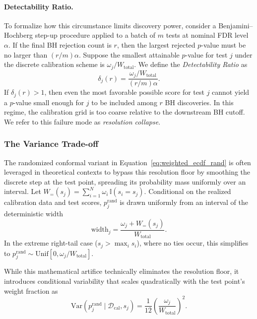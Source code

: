 \paragraph{Detectability Ratio.}
To formalize how this circumstance limits discovery power, consider
a Benjamini--Hochberg step-up procedure applied to a batch of \(m\) tests at
nominal FDR level \(\alpha\). If the final BH rejection count is \(r\), then
the largest rejected \(p\)-value must be no larger than
\((r/m)\alpha\). Suppose the smallest attainable \(p\)-value for test \(j\)
under the discrete calibration scheme is
\(\omega_j/W_{\mathrm{total}}\). We define the \textit{Detectability Ratio}
as
\begin{equation}\label{eq:detectability_ratio}
\delta_j(r)
=
\frac{\displaystyle \omega_j/W_{\mathrm{total}}}
{\displaystyle (r/m)\alpha}.
\end{equation}
If \(\delta_j(r)>1\), then even the most favorable possible score for test
\(j\) cannot yield a \(p\)-value small enough for \(j\) to be included among
\(r\) BH discoveries. In this regime, the calibration grid is too coarse
relative to the downstream BH cutoff. We refer to this failure mode as
\textit{resolution collapse}.

\subsubsection{The Variance Trade-off}
The randomized conformal variant in Equation~\eqref{eq:weighted_ecdf_rand} is often leveraged in theoretical contexts to bypass this resolution floor by smoothing the discrete step at the test point, spreading its probability mass uniformly over an interval. Let $W_{=}(s_j)=\sum_{i=1}^N \omega_i\,\mathbb{I}(s_i=s_j)$. Conditional on the realized calibration data and test scores, $p_j^{\mathrm{rand}}$ is drawn uniformly from an interval of the deterministic width 
\begin{equation}
\mathrm{width}_j = \frac{\omega_j + W_{=}(s_j)}{W_{\mathrm{total}}}.
\end{equation}
In the extreme right-tail case ($s_j > \max_i s_i$), where no ties occur, this simplifies to $p_j^{\mathrm{rand}} \sim \mathrm{Unif}[0, \omega_j/W_{\mathrm{total}}]$.

While this mathematical artifice technically eliminates the resolution floor, it introduces conditional variability that scales quadratically with the test point's weight fraction as
\begin{equation}
\mathrm{Var}\!\left(p_j^{\mathrm{rand}} \mid \mathcal{D}_{\mathrm{cal}}, s_j\right) = \frac{1}{12}\left(\frac{\omega_j}{W_{\mathrm{total}}}\right)^2.
\end{equation}

